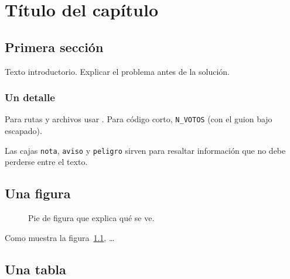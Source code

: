 %
\chapter{Título del capítulo}
\label{cap:mi-capitulo}

\section{Primera sección}

Texto introductorio. Explicar el problema antes de la solución.

\subsection{Un detalle}

Para rutas y archivos usar . Para código corto,
\texttt{N\_VOTOS} (con el guion bajo escapado).

\begin{nota}
Las cajas \texttt{nota}, \texttt{aviso} y \texttt{peligro} sirven para
resaltar información que no debe perderse entre el texto.
\end{nota}

\section{Una figura}

\begin{figure}[htbp]
  \centering
  \caption{Pie de figura que explica qué se ve.}
  \label{fig:mi-figura}
\end{figure}

Como muestra la figura~\ref{fig:mi-figura}, \ldots

\section{Una tabla}

